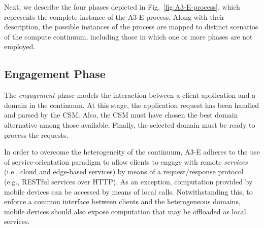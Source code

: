 


Next, we describe the four phases depicted in Fig.~\ref{fig:A3-E-process}, which represents the complete instance of the A3-E process. Along with their description, the possible instances of the process are mapped to distinct scenarios of the compute continuum, including those in which one or more phases are not employed.



\subsection{Engagement Phase}\label{sec:A3-E-engagement}

The \textit{engagement} phase models the interaction between a client application and a domain in the continuum. At this stage, the application request has been handled and parsed by the CSM. Also, the CSM must have chosen the best domain alternative among those available. Finally, the selected domain must be ready to process the requests.

In order to overcome the heterogeneity of the continuum, A3-E adheres to the use of service-orientation paradigm to allow clients to engage with remote \textit{services} (i.e., cloud and edge-based services) by means of a request/response protocol (e.g., RESTful services over HTTP). As an exception, computation provided by mobile devices can be accessed by means of local calls. Notwithstanding this, to enforce a common interface between clients and the heterogeneous domains, mobile devices should also expose computation that may be offloaded as local services. 

